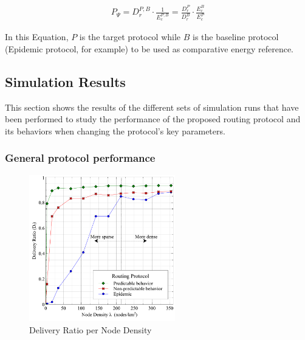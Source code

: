 \documentclass[conference]{IEEEtran}
\begin{document}
\begin{eqnarray}
\label{eq:protocol_performance}
{ P }_{ \Psi }= {{ D }_{ r }^{ P,B }} \cdot \frac { 1 }{ { E }_{c}^{ P,B } } 
= \frac {{ D }_{ r }^{ P }}{{ D }_{ r }^{ B } } \cdot \frac{{ E }_{c}^{ B }}{{ E }_{c}^{ P }}
\end{eqnarray}

In this Equation, $P$ is the target protocol while $B$ is the baseline protocol (Epidemic protocol, for example) to be used as comparative energy reference.

\subsection{Simulation Results}

This section shows the results of the different sets of simulation runs that have been performed to study the performance of the proposed routing protocol and its behaviors when changing the protocol's key parameters.

\subsubsection{General protocol performance}

\begin{figure}[!t]
	\centering
	\includegraphics[width=2.5in]{Graphs/DeliveryRatio.pdf}
	\caption{Delivery Ratio per Node Density}
	\label{Delivery Ratio per Node Density}
\end{figure}
\end{document}
